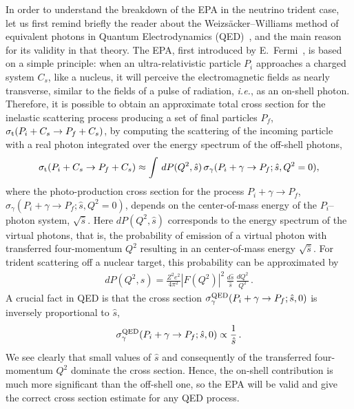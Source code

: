 In order to understand the breakdown of the EPA in the neutrino trident case, let us first remind briefly the reader about the Weizs\"acker--Williams method of equivalent photons in Quantum Electrodynamics (QED)~\cite{vonWeizsacker:1934nji,Williams:1934ad}, and the main reason for its validity in that theory. The EPA, first introduced by E.\ Fermi~\cite{Fermi:1924tc}, is based on a simple principle: when an ultra-relativistic particle $P_i$ approaches a charged system $C_s$, like a nucleus, it will perceive the electromagnetic fields as nearly transverse, similar to the fields of a pulse of radiation, {\it i.e.},  as an on-shell photon. Therefore, it is possible to obtain an approximate total cross section for the inelastic scattering process producing a set of final particles $P_f$, $\sigma_{\rm t}(P_i + C_s \to P_f + C_s)$, by computing the scattering of the incoming particle with a real photon integrated over the energy spectrum of the off-shell photons,
%
\begin{align}
	\sigma_{\rm t}(P_i + C_s \to P_f + C_s)\approx\int\, dP(Q^2,\hat{s})\,\sigma_\gamma(P_i + \gamma \to P_f; \hat{s}, Q^2 = 0),
\end{align}
where the photo-production cross section for the process $P_i + \gamma \to P_f$, 
$\sigma_\gamma(P_i + \gamma \to P_f; \hat{s}, Q^2 = 0)$, 
depends on the center-of-mass energy of the $P_i$--photon system, $\sqrt{\hat{s}}$. Here $dP(Q^2,\hat{s})$ corresponds to the energy spectrum of the virtual photons, that is, the probability of emission of a virtual photon with transferred four-momentum $Q^2$ resulting in an center-of-mass energy $\sqrt{\hat{s}}$.
For trident scattering off a nuclear target, this probability can be approximated by~\cite{Belusevic:1987cw,Altmannshofer:2014pba}
\begin{align}\label{eq:GenEPA}
	dP(Q^2,\hat{s})=\frac{Z^2e^2}{4\pi^2}|F (Q^2)|^2\,\frac{d\hat{s}}{\hat{s}}\,\frac{dQ^2}{Q^2}\, .
\end{align}
A crucial fact in QED is that the cross section $\sigma_\gamma^{\rm QED}(P_i + \gamma \to P_f; \hat{s},0)$ is inversely proportional to $\hat{s}$,
\begin{align*}
	\sigma_\gamma^{\rm QED}(P_i + \gamma \to P_f; \hat{s},0) \propto \frac{1}{\hat{s}}\,.
\end{align*}
We see clearly that small values of $\hat{s}$ and consequently of the transferred four-momentum $Q^2$ dominate the cross section. Hence, the on-shell contribution is much more significant 
than the off-shell one, so the EPA will be valid and give the correct cross  section 
estimate for any QED process. 

